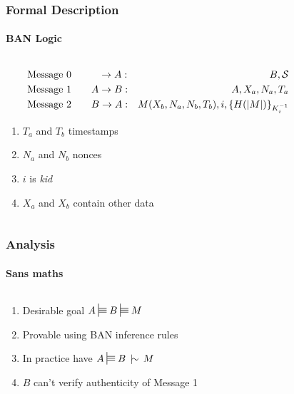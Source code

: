 \documentclass[handout, aspectratio=169, notes=hide]{beamer}
\newcommand{\nc}{\,\mid\!\sim\,}
\begin{document}

\begin{frame}
\frametitle{Formal Description}
\framesubtitle{BAN Logic}
\setlength{\parskip}{1.0em}
\begin{columns}[T]
\begin{column}[T]{0.77\textwidth}	
\setlength{\parskip}{1.0em}

\begin{eqnarray*}
\text{Message 0} & \qquad \hphantom{A} \rightarrow A : & B, \mathcal{S} \\
\text{Message 1} & \qquad A \rightarrow B : & A, X_a, N_a, T_a \\
\text{Message 2} & \qquad B \rightarrow A : & M(X_b, N_a, N_b, T_b), i, \left\{ H(|M|)\right\}_{K_{i}^{-1}}
\end{eqnarray*}
\begin{enumerate}
\item $T_a$ and $T_b$ timestamps
\item $N_a$ and $N_b$ nonces
\item $i$ is {\it kid}
\item $X_a$ and $X_b$ contain other data
\end{enumerate}
\end{column}

\begin{column}[T]{0.0\textwidth}
\end{column}
\end{columns}

\end{frame}
\note{
}


\begin{frame}
\frametitle{Analysis}
\framesubtitle{Sans maths}
\setlength{\parskip}{1.0em}
\begin{columns}[T]
\begin{column}[T]{1.0\textwidth}	
\setlength{\parskip}{1.0em}

\begin{enumerate}
\setlength{\parskip}{1.0em}
\item Desirable goal $A \sttstile{}{} B \sttstile{}{} M$
\item Provable using BAN inference rules
\item In practice have $A \sttstile{}{} B \nc M$
\item $B$ can't verify authenticity of Message 1
\end{enumerate}
\end{column}

\begin{column}[T]{0.0\textwidth}
\end{column}
\end{columns}

\end{frame}
\note{
}
\end{document}
